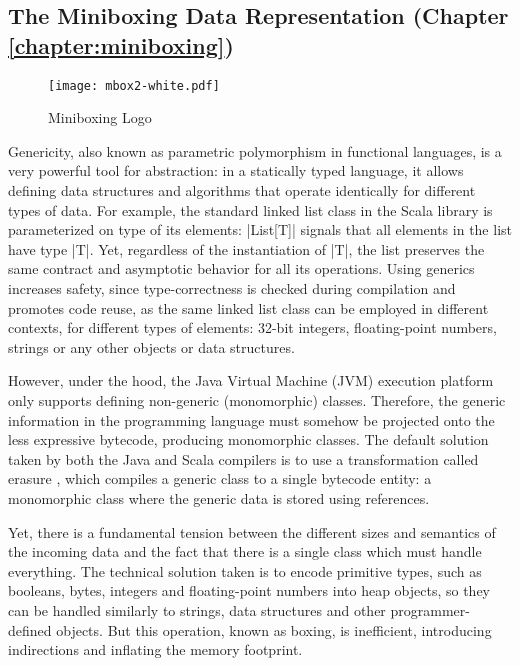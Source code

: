 \subsection{The Miniboxing Data Representation (Chapter \ref{chapter:miniboxing})}

\begin{wrapfigure}{r}{50mm}
  \centering
  \vspace{-3em}
  \texttt{[image: mbox2-white.pdf]}
  \vspace{-3em}
  \caption{Miniboxing Logo}
\end{wrapfigure}

Genericity, also known as parametric polymorphism in functional languages, is a very powerful tool for abstraction: in a statically typed language, it allows defining data structures and algorithms that operate identically for different types of data. For example, the standard linked list class in the Scala library is parameterized on type of its elements: |List[T]| signals that all elements in the list have type |T|. Yet, regardless of the instantiation of |T|, the list preserves the same contract and asymptotic behavior for all its operations. Using generics increases safety, since type-correctness is checked during compilation and promotes code reuse, as the same linked list class can be employed in different contexts, for different types of elements: 32-bit integers, floating-point numbers, strings or any other objects or data structures.

However, under the hood, the Java Virtual Machine (JVM) execution platform only supports defining non-generic (monomorphic) classes. Therefore, the generic information in the programming language must somehow be projected onto the less expressive bytecode, producing monomorphic classes. The default solution taken by both the Java and Scala compilers is to use a transformation called erasure \cite{java-erasure}, which compiles a generic class to a single bytecode entity: a monomorphic class where the generic data is stored using references.

Yet, there is a fundamental tension between the different sizes and semantics of the incoming data and the fact that there is a single class which must handle everything. The technical solution taken is to encode primitive types, such as booleans, bytes, integers and floating-point numbers into heap objects, so they can be handled similarly to strings, data structures and other programmer-defined objects. But this operation, known as boxing, is inefficient, introducing indirections and inflating the memory footprint.

